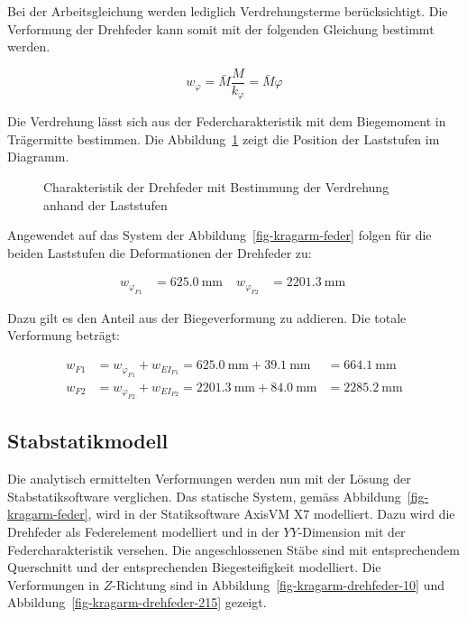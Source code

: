 \documentclass[
  11pt,
  letterpaper,
]{scrreprt}
\begin{document}
Bei der Arbeitsgleichung werden lediglich Verdrehungsterme
berücksichtigt. Die Verformung der Drehfeder kann somit mit der
folgenden Gleichung bestimmt werden.

\[
w_{\varphi} = \bar{M} \frac{M}{k_\varphi} = \bar{M} \varphi
\]

Die Verdrehung lässt sich aus der Federcharakteristik mit dem
Biegemoment in Trägermitte bestimmen. Die
Abbildung~\ref{fig-feder-force} zeigt die Position der Laststufen im
Diagramm.

\begin{figure}[H]


\caption{\label{fig-feder-force}Charakteristik der Drehfeder mit
Bestimmung der Verdrehung anhand der Laststufen}

\end{figure}%

Angewendet auf das System der Abbildung~\ref{fig-kragarm-feder} folgen
für die beiden Laststufen die Deformationen der Drehfeder zu:

$$
\begin{aligned}
w_{\varphi_{F1}} &= 625.0\ \mathrm{mm} \; 
 &w_{\varphi_{F2}} &= 2201.3\ \mathrm{mm} \;
\end{aligned}
$$

Dazu gilt es den Anteil aus der Biegeverformung zu addieren. Die totale
Verformung beträgt:

$$
\begin{aligned}
w_{F1} &= w_{\varphi_{F1}} + w_{EI_{F1}}  = 625.0\ \mathrm{mm} + 39.1\ \mathrm{mm} &= 664.1\ \mathrm{mm}  
\\[11pt]
w_{F2} &= w_{\varphi_{F2}} + w_{EI_{F2}}  = 2201.3\ \mathrm{mm} + 84.0\ \mathrm{mm} &= 2285.2\ \mathrm{mm}  
\end{aligned}
$$

\subsection{Stabstatikmodell}\label{stabstatikmodell}

Die analytisch ermittelten Verformungen werden nun mit der Lösung der
Stabstatiksoftware verglichen. Das statische System, gemäss
Abbildung~\ref{fig-kragarm-feder}, wird in der Statiksoftware AxisVM X7
modelliert. Dazu wird die Drehfeder als Federelement modelliert und in
der \(YY\)-Dimension mit der Federcharakteristik versehen. Die
angeschlossenen Stäbe sind mit entsprechendem Querschnitt und der
entsprechenden Biegesteifigkeit modelliert. Die Verformungen in
\(Z\)-Richtung sind in Abbildung~\ref{fig-kragarm-drehfeder-10} und
Abbildung~\ref{fig-kragarm-drehfeder-215} gezeigt.
\end{document}
